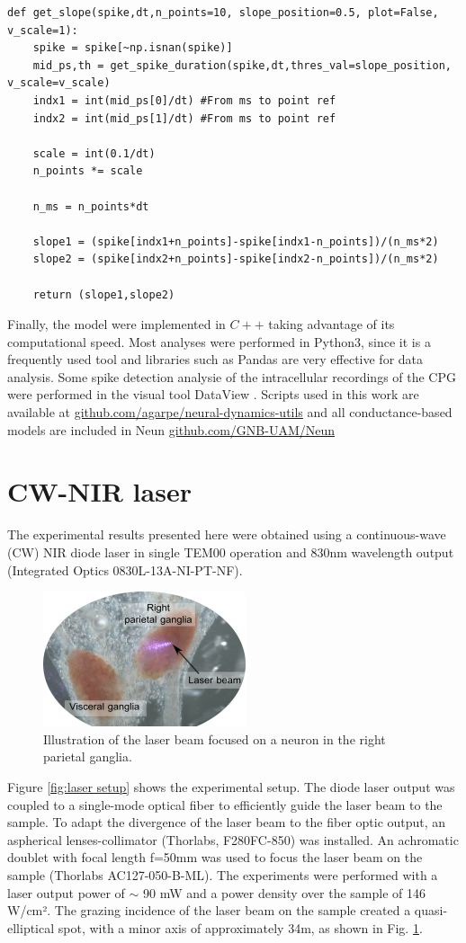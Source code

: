 \begin{lstlisting}
def get_slope(spike,dt,n_points=10, slope_position=0.5, plot=False, v_scale=1):
	spike = spike[~np.isnan(spike)] 
	mid_ps,th = get_spike_duration(spike,dt,thres_val=slope_position, v_scale=v_scale)
	indx1 = int(mid_ps[0]/dt) #From ms to point ref
	indx2 = int(mid_ps[1]/dt) #From ms to point ref
	
	scale = int(0.1/dt)
	n_points *= scale
	
	n_ms = n_points*dt
	
	slope1 = (spike[indx1+n_points]-spike[indx1-n_points])/(n_ms*2) 
	slope2 = (spike[indx2+n_points]-spike[indx2-n_points])/(n_ms*2)

	return (slope1,slope2)
\end{lstlisting}

Finally, the model were implemented in $C++$ taking advantage of its computational speed. Most analyses were performed in Python3, since it is a frequently used tool and libraries such as Pandas are very effective for data analysis. Some spike detection analysie of the intracellular recordings of the CPG were performed in the visual tool DataView \parencite{heitler_dataview_2007}. Scripts used in this work are available at \href{https://github.com/agarpe/neural-dynamics-utils}{github.com/agarpe/neural-dynamics-utils} and all conductance-based models are included in Neun \href{https://github.com/GNB-UAM/Neun}{github.com/GNB-UAM/Neun}


\section{CW-NIR laser}
The experimental results presented here were obtained using a continuous-wave (CW) NIR diode laser in single TEM00 operation and 830nm wavelength output (Integrated Optics 0830L-13A-NI-PT-NF). 
\begin{figure}
    \centering
	\includegraphics{img/laser/laser-beam.png}
	\caption{Illustration of the laser beam focused on a neuron in the right parietal ganglia.}
	\label{fig:laser beam}
\end{figure} 
Figure \ref{fig:laser setup} shows the experimental setup. The diode laser output was coupled to a single-mode optical fiber to efficiently guide the laser beam to the sample. To adapt the divergence of the laser beam to the fiber optic output, an aspherical lenses-collimator (Thorlabs, F280FC-850) was installed. An achromatic doublet with focal length f=50mm was used to focus the laser beam on the sample (Thorlabs AC127-050-B-ML). The experiments were performed with a laser output power of $\sim$ 90 mW and a power density over the sample of 146 W/cm². The grazing incidence of the laser beam on the sample created a quasi-elliptical spot, with a minor axis of approximately 34{\textmu}m, as shown in Fig. \ref{fig:laser beam}.

